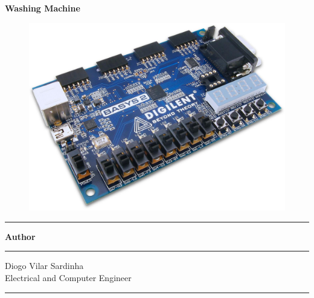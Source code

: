 \begin{titlepage}
	\begin{center}
				
		{\huge \bfseries Washing Machine}\\[2cm]
		
		\begin{figure}[H]
			\centering
			\includegraphics[width=1\textwidth]{img/basys2}
		\end{figure}
	
		\begin{minipage}{\textwidth}
			\begin{center} \large
				{
					\begin{center}
						\rule{\linewidth}{0.5mm}
						\textbf{Author}
						\rule{\linewidth}{0.5mm}
					\end{center}
				}{			
					\begin{center}
						\large Diogo Vilar Sardinha	\\
						\large	Electrical and Computer Engineer \\
						\rule{\linewidth}{0.5mm}
					\end{center}
				}
			\end{center}
		\end{minipage} \\[1cm]
	
		\vspace{\fill} 
		\begin{minipage}[b]{\textwidth}
			\centering
			\large   
		\end{minipage}
		
		\pagebreak
		
	\end{center}
\end{titlepage}